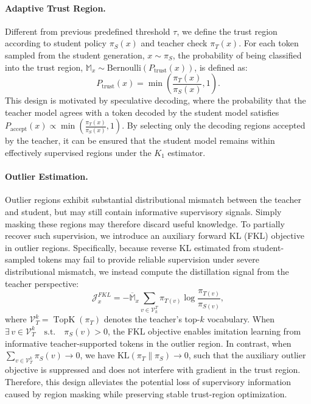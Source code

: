\documentclass{llmxive}
\begin{document}
\paragraph{Adaptive Trust Region.}
Different from previous predefined threshold $\tau$, we define the  trust region according to student policy $\pi_S(x)$ and teacher check $\pi_T(x)$.
For each token sampled from the student generation, $x \sim \pi_S$, 
the probability of being classified into the trust region, ${\mathbb{M}_{x}}
\sim
\mathrm{Bernoulli}\!\left(P_{\mathrm{trust}}(x)\right)$, is defined as:
\begin{equation}
P_{\mathrm{trust}}(x)
=
\min\left(
\frac{\pi_T(x)}{\pi_S(x)},
1
\right).
\end{equation}
This design is motivated by speculative decoding, where the probability that the teacher model agrees with a token decoded by the student model satisfies $P_{\mathrm{accept}}(x) \propto \min\left(\frac{\pi_T(x)}{\pi_S(x)}, 1\right)$. By selecting only the decoding regions accepted by the teacher, it can be ensured that the student model remains within effectively supervised regions under the $K_1$ estimator.




\paragraph{Outlier Estimation.}
Outlier regions exhibit substantial distributional mismatch between the teacher and student, but may still contain informative supervisory signals. Simply masking these regions may therefore discard useful knowledge. To partially recover such supervision, we introduce an auxiliary forward KL (FKL) objective in outlier regions. Specifically, because reverse KL estimated from student-sampled tokens may fail to provide reliable supervision under severe distributional mismatch, we instead compute the distillation signal from the teacher perspective:
\begin{equation}
\mathcal{J}_{x}^{FKL}
=
-{\overline{\mathbb{M}}_{x}}
    {
    \sum_{v \in \mathcal{V}^{T}_{k}}
    \pi_{T(v)}
    \log \frac{\pi_{T(v)}}{\pi_{S(v)}}
    },
\end{equation}
where $\mathcal{V}_{T}^{k}=\operatorname{TopK}(\pi_T)$ denotes the teacher's top-$k$ vocabulary.
When $\exists\, v \in \mathcal{V}_{T}^{k} \quad \text{s.t.} \quad \pi_S(v) > 0$, the FKL objective enables imitation learning from informative teacher-supported tokens in the outlier region. In contrast, when
$\sum_{v \in \mathcal{V}_{T}^{k}} \pi_S(v) \rightarrow 0$,
we have $\mathrm{KL}(\pi_T \parallel \pi_S) \rightarrow 0$, such that the auxiliary outlier objective is suppressed and does not interfere with gradient in the trust region. Therefore, this design alleviates the potential loss of supervisory information caused by region masking while preserving stable trust-region optimization.
\end{document}
